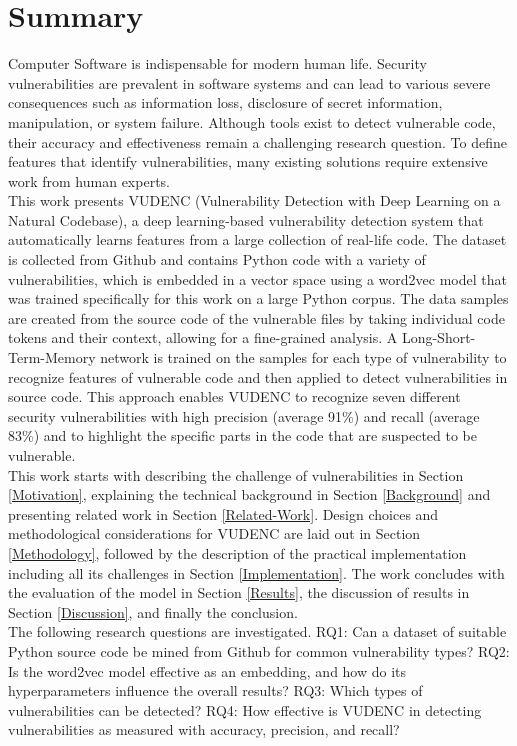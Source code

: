\documentclass[
a4paper,
pagesize,
pdftex,
12pt,
ngerman,
fleqn,
final,
]{scrartcl}
\begin{document}
	\section{Summary}
	Computer Software is indispensable for modern human life. Security vulnerabilities are prevalent in software systems and can lead to various severe consequences such as information loss, disclosure of secret information, manipulation, or system failure. Although tools exist to detect vulnerable code, their accuracy and effectiveness remain a challenging research question. To define features that identify vulnerabilities, many existing solutions require extensive work from human experts.\\ 
	This work presents VUDENC (Vulnerability Detection with Deep Learning on a Natural Codebase), a deep learning-based vulnerability detection system that automatically learns features from a large collection of real-life code. The dataset is collected from Github and contains Python code with a variety of vulnerabilities, which is embedded in a vector space using a word2vec model that was trained specifically for this work on a large Python corpus. The data samples are created from the source code of the vulnerable files by taking individual code tokens and their context, allowing for a fine-grained analysis. A Long-Short-Term-Memory network is trained on the samples for each type of vulnerability to recognize features of vulnerable code and then applied to detect vulnerabilities in source code. This approach enables VUDENC to recognize seven different security vulnerabilities with high precision (average 91\%) and recall (average 83\%) and to highlight the specific parts in the code that are suspected to be vulnerable.\\	
	This work starts with describing the challenge of vulnerabilities in Section \ref{Motivation}, explaining the technical background in Section \ref{Background} and presenting related work in Section \ref{Related-Work}. Design choices and methodological considerations for VUDENC are laid out in Section \ref{Methodology}, followed by the description of the practical implementation including all its challenges in Section \ref{Implementation}. The work concludes with the evaluation of the model in Section \ref{Results}, the discussion of results in Section \ref{Discussion}, and finally the conclusion.\\	
	The following research questions are investigated. RQ1: Can a dataset of suitable Python source code be mined from Github for common vulnerability types? RQ2: Is the word2vec model effective as an embedding, and how do its hyperparameters influence the overall results? RQ3: Which types of vulnerabilities can be detected? RQ4: How effective is VUDENC in detecting vulnerabilities as measured with accuracy, precision, and recall? \\
	
\end{document}
